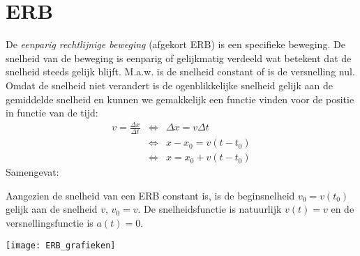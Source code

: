 \documentclass{ximera}
\begin{document}
	\author{Bart Lambregs}
    \xmsource



	\section{ERB}

	De \emph{eenparig rechtlijnige beweging} (afgekort ERB) is een specifieke beweging. De snelheid van de beweging is eenparig of gelijkmatig verdeeld wat betekent dat de snelheid steeds gelijk blijft. M.a.w. is de snelheid constant of is de versnelling nul. Omdat de snelheid niet verandert is de ogenblikkelijke snelheid gelijk aan de gemiddelde snelheid en kunnen we gemakkelijk een functie vinden voor de positie in functie van de tijd:
	\begin{eqnarray*}
	v=\frac{\Delta x}{\Delta t}&\Leftrightarrow&\Delta x=v\Delta t\\
	&\Leftrightarrow&x-x_0=v(t-t_0)\\
	&\Leftrightarrow&x=x_0+v(t-t_0)
	\end{eqnarray*}
	Samengevat:
	
	
	
	Aangezien de snelheid van een ERB constant is, is de beginsnelheid $v_0=v(t_0)$ gelijk aan de snelheid $v$, $v_0=v$. De snelheidsfunctie is natuurlijk $v(t)=v$ en de versnellingsfunctie is $a(t)=0$.
	\begin{image}
	
	\texttt{[image: ERB\_grafieken]}
	\end{image}
	
	
	
\end{document}

